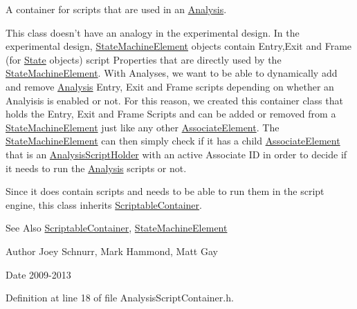 A container for scripts that are used in an \hyperlink{class_picto_1_1_analysis}{Analysis}.

This class doesn't have an analogy in the experimental design. In the experimental design, \hyperlink{class_picto_1_1_state_machine_element}{State\-Machine\-Element} objects contain Entry,Exit and Frame (for \hyperlink{class_picto_1_1_state}{State} objects) script Properties that are directly used by the \hyperlink{class_picto_1_1_state_machine_element}{State\-Machine\-Element}. With Analyses, we want to be able to dynamically add and remove \hyperlink{class_picto_1_1_analysis}{Analysis} Entry, Exit and Frame scripts depending on whether an Analyisis is enabled or not. For this reason, we created this container class that holds the Entry, Exit and Frame Scripts and can be added or removed from a \hyperlink{class_picto_1_1_state_machine_element}{State\-Machine\-Element} just like any other \hyperlink{class_picto_1_1_associate_element}{Associate\-Element}. The \hyperlink{class_picto_1_1_state_machine_element}{State\-Machine\-Element} can then simply check if it has a child \hyperlink{class_picto_1_1_associate_element}{Associate\-Element} that is an \hyperlink{class_picto_1_1_analysis_script_holder}{Analysis\-Script\-Holder} with an active Associate I\-D in order to decide if it needs to run the \hyperlink{class_picto_1_1_analysis}{Analysis} scripts or not.

Since it does contain scripts and needs to be able to run them in the script engine, this class inherits \hyperlink{class_picto_1_1_scriptable_container}{Scriptable\-Container}. \begin{DoxySeeAlso}{See Also}
\hyperlink{class_picto_1_1_scriptable_container}{Scriptable\-Container}, \hyperlink{class_picto_1_1_state_machine_element}{State\-Machine\-Element} 
\end{DoxySeeAlso}
\begin{DoxyAuthor}{Author}
Joey Schnurr, Mark Hammond, Matt Gay 
\end{DoxyAuthor}
\begin{DoxyDate}{Date}
2009-\/2013 
\end{DoxyDate}


Definition at line 18 of file Analysis\-Script\-Container.\-h.



